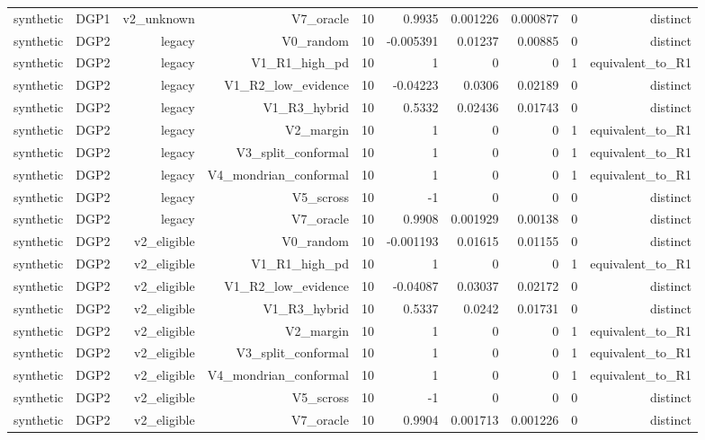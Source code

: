 \begin{table}[htbp]
\begin{tabular}{lrrrrrrrrr}
    synthetic & DGP1 & v2\_unknown & V7\_oracle & 10 & 0.9935 & 0.001226 & 0.000877 & 0 & distinct \\
    synthetic & DGP2 & legacy & V0\_random & 10 & -0.005391 & 0.01237 & 0.00885 & 0 & distinct \\
    synthetic & DGP2 & legacy & V1\_R1\_high\_pd & 10 & 1 & 0 & 0 & 1 & equivalent\_to\_R1 \\
    synthetic & DGP2 & legacy & V1\_R2\_low\_evidence & 10 & -0.04223 & 0.0306 & 0.02189 & 0 & distinct \\
    synthetic & DGP2 & legacy & V1\_R3\_hybrid & 10 & 0.5332 & 0.02436 & 0.01743 & 0 & distinct \\
    synthetic & DGP2 & legacy & V2\_margin & 10 & 1 & 0 & 0 & 1 & equivalent\_to\_R1 \\
    synthetic & DGP2 & legacy & V3\_split\_conformal & 10 & 1 & 0 & 0 & 1 & equivalent\_to\_R1 \\
    synthetic & DGP2 & legacy & V4\_mondrian\_conformal & 10 & 1 & 0 & 0 & 1 & equivalent\_to\_R1 \\
    synthetic & DGP2 & legacy & V5\_scross & 10 & -1 & 0 & 0 & 0 & distinct \\
    synthetic & DGP2 & legacy & V7\_oracle & 10 & 0.9908 & 0.001929 & 0.00138 & 0 & distinct \\
    synthetic & DGP2 & v2\_eligible & V0\_random & 10 & -0.001193 & 0.01615 & 0.01155 & 0 & distinct \\
    synthetic & DGP2 & v2\_eligible & V1\_R1\_high\_pd & 10 & 1 & 0 & 0 & 1 & equivalent\_to\_R1 \\
    synthetic & DGP2 & v2\_eligible & V1\_R2\_low\_evidence & 10 & -0.04087 & 0.03037 & 0.02172 & 0 & distinct \\
    synthetic & DGP2 & v2\_eligible & V1\_R3\_hybrid & 10 & 0.5337 & 0.0242 & 0.01731 & 0 & distinct \\
    synthetic & DGP2 & v2\_eligible & V2\_margin & 10 & 1 & 0 & 0 & 1 & equivalent\_to\_R1 \\
    synthetic & DGP2 & v2\_eligible & V3\_split\_conformal & 10 & 1 & 0 & 0 & 1 & equivalent\_to\_R1 \\
    synthetic & DGP2 & v2\_eligible & V4\_mondrian\_conformal & 10 & 1 & 0 & 0 & 1 & equivalent\_to\_R1 \\
    synthetic & DGP2 & v2\_eligible & V5\_scross & 10 & -1 & 0 & 0 & 0 & distinct \\
    synthetic & DGP2 & v2\_eligible & V7\_oracle & 10 & 0.9904 & 0.001713 & 0.001226 & 0 & distinct \\

\end{tabular}
\end{table}
